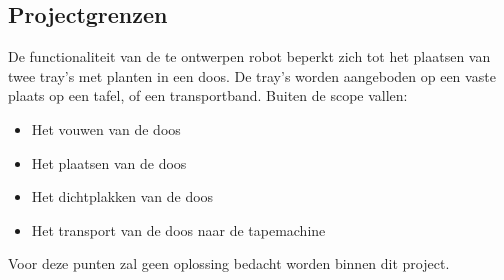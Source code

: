 \begin{grenzen}
	\section{Projectgrenzen}
	De functionaliteit van de te ontwerpen robot beperkt zich tot het plaatsen van twee tray's met planten in een doos. De tray's worden aangeboden op een vaste plaats op een tafel, of een transportband. 
	\newline
	\newline
	Buiten de scope vallen:
	\begin{itemize}
	    \item Het vouwen van de doos
	    \item Het plaatsen van de doos
	    \item Het dichtplakken van de doos
	    \item Het transport van de doos naar de tapemachine
	\end{itemize}
	Voor deze punten zal geen oplossing bedacht worden binnen dit project.

\end{grenzen}


